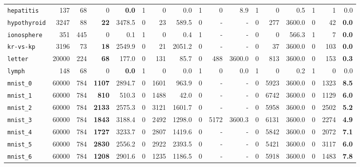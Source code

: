 \begin{tabular}{lccrrrrrrrrrrrrrr}
\texttt{hepatitis} & \multicolumn{1}{r}{137} & \multicolumn{1}{r}{68}  & 0 & \textbf{0.0} & 1 & 0 & 0.0 & 1 & 0 & 8.9 & 1 & 0 & 0.5 & 1 & 1 & 0.0\\
\texttt{hypothyroid} & \multicolumn{1}{r}{3247} & \multicolumn{1}{r}{88}  & \textbf{22} & 3478.5 & 0 & 23 & 589.5 & 0 & - & - & 0 & 277 & 3600.0 & 0 & 42 & \textbf{0.0}\\
\texttt{ionosphere} & \multicolumn{1}{r}{351} & \multicolumn{1}{r}{445}  & 0 & 0.1 & 1 & 0 & 0.4 & 1 & - & - & 0 & 0 & 566.3 & 1 & 7 & \textbf{0.0}\\
\texttt{kr-vs-kp} & \multicolumn{1}{r}{3196} & \multicolumn{1}{r}{73}  & \textbf{18} & 2549.9 & 0 & 21 & 2051.2 & 0 & - & - & 0 & 37 & 3600.0 & 0 & 103 & \textbf{0.0}\\
\texttt{letter} & \multicolumn{1}{r}{20000} & \multicolumn{1}{r}{224}  & \textbf{68} & 177.0 & 0 & 131 & 85.7 & 0 & 488 & 3600.0 & 0 & 813 & 3600.0 & 0 & 153 & \textbf{0.3}\\
\texttt{lymph} & \multicolumn{1}{r}{148} & \multicolumn{1}{r}{68}  & 0 & \textbf{0.0} & 1 & 0 & 0.0 & 1 & 0 & 0.0 & 1 & 0 & 0.2 & 1 & 0 & 0.0\\
\texttt{mnist\_0} & \multicolumn{1}{r}{60000} & \multicolumn{1}{r}{784}  & \textbf{1107} & 2894.7 & 0 & 1601 & 963.9 & 0 & - & - & 0 & 5923 & 3600.0 & 0 & 1323 & \textbf{8.5}\\
\texttt{mnist\_1} & \multicolumn{1}{r}{60000} & \multicolumn{1}{r}{784}  & \textbf{810} & 510.3 & 0 & 1488 & 42.0 & 0 & - & - & 0 & 6742 & 3600.0 & 0 & 1129 & \textbf{6.0}\\
\texttt{mnist\_2} & \multicolumn{1}{r}{60000} & \multicolumn{1}{r}{784}  & \textbf{2133} & 2575.3 & 0 & 3121 & 1601.7 & 0 & - & - & 0 & 5958 & 3600.0 & 0 & 2502 & \textbf{5.2}\\
\texttt{mnist\_3} & \multicolumn{1}{r}{60000} & \multicolumn{1}{r}{784}  & \textbf{1843} & 3188.4 & 0 & 2492 & 1298.0 & 0 & 5172 & 3600.3 & 0 & 6131 & 3600.0 & 0 & 2274 & \textbf{4.9}\\
\texttt{mnist\_4} & \multicolumn{1}{r}{60000} & \multicolumn{1}{r}{784}  & \textbf{1727} & 3233.7 & 0 & 2807 & 1419.6 & 0 & - & - & 0 & 5842 & 3600.0 & 0 & 2072 & \textbf{7.1}\\
\texttt{mnist\_5} & \multicolumn{1}{r}{60000} & \multicolumn{1}{r}{784}  & \textbf{2830} & 2556.2 & 0 & 2922 & 2393.5 & 0 & - & - & 0 & 5421 & 3600.0 & 0 & 3117 & \textbf{6.0}\\
\texttt{mnist\_6} & \multicolumn{1}{r}{60000} & \multicolumn{1}{r}{784}  & \textbf{1208} & 2901.6 & 0 & 1235 & 1186.5 & 0 & - & - & 0 & 5918 & 3600.0 & 0 & 1483 & \textbf{7.8}\\

\end{tabular}
